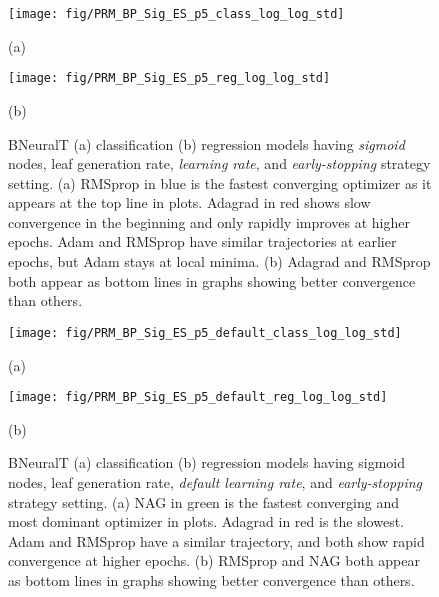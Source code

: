 \documentclass[11pt,a4paper]{article}
\begin{document}
\begin{figure}
        \centering
        \texttt{[image: fig/PRM\_BP\_Sig\_ES\_p5\_class\_log\_log\_std]}


        (a)
        
        \centering
        \texttt{[image: fig/PRM\_BP\_Sig\_ES\_p5\_reg\_log\_log\_std]}
        
        (b)
        \caption{BNeuralT (a) classification (b) regression models having \textit{sigmoid} nodes,  leaf generation rate,  \textit{learning rate}, and \textit{early-stopping} strategy setting.
        (a) RMSprop in blue is the fastest converging optimizer as it appears at the top line in plots. Adagrad in red shows slow convergence in the beginning and only rapidly improves at higher epochs. Adam and RMSprop have similar trajectories at earlier epochs, but Adam stays at local minima. (b) Adagrad and RMSprop both appear as bottom lines in graphs showing better convergence than others.  
\label{fig:PRM_BP_Sig_ES_p5}}
    \end{figure}
    
\begin{figure}
        \centering
        \texttt{[image: fig/PRM\_BP\_Sig\_ES\_p5\_default\_class\_log\_log\_std]}
        
        (a)


        \centering
        \texttt{[image: fig/PRM\_BP\_Sig\_ES\_p5\_default\_reg\_log\_log\_std]}
        
        (b)
        \caption{BNeuralT (a) classification (b) regression models having sigmoid nodes,  leaf generation rate, \textit{default learning rate}, and \textit{early-stopping} strategy setting.
        (a) NAG in green is the fastest converging and most dominant  optimizer in plots. Adagrad in red is the slowest. Adam and RMSprop have a similar trajectory, and both show rapid convergence at higher epochs. (b) RMSprop and NAG both appear as bottom lines in graphs showing better convergence than others. 
\label{fig:PRM_BP_Sig_ES_p5_default}}
    \end{figure}
    
\end{document}
